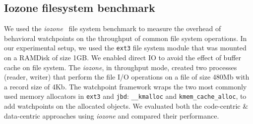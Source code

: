 \subsection{Iozone filesystem benchmark}
We used the \emph{iozone}~\cite{citeulike:919086} file system benchmark to measure the overhead of behavioral watchpoints on the throughput of common file system operations. In our experimental setup, we used the \texttt{ext3} file system module that was mounted on a RAMDisk of size 1GB. We enabled direct IO to avoid the effect of buffer cache on file system. The \emph{iozone}, in throughput mode, created two processes (reader, writer) that perform the file I/O operations on a file of size 480Mb with a record size of 4Kb. The watchpoint framework wraps the two most commonly used memory allocators in \texttt{ext3} and \texttt{jbd}: \texttt{\_\_kmalloc} and \texttt{kmem\_cache\_alloc}, to add watchpoints on the allocated objects. We evaluated both the code-centric \& data-centric approaches using \emph{iozone} and compared their performance.




